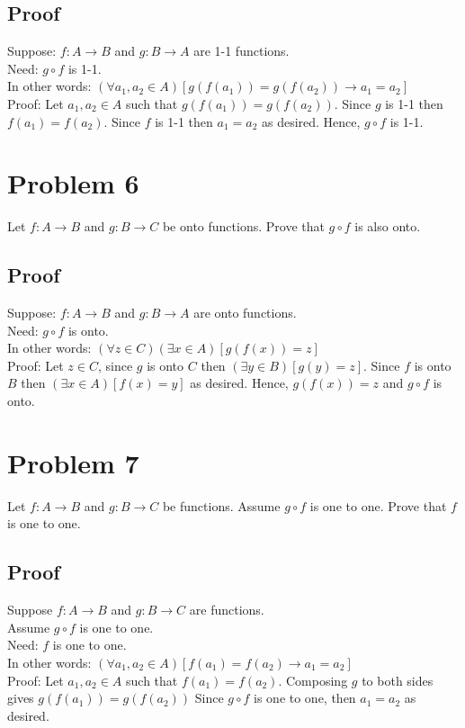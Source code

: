 \documentclass{article}
\begin{document}
\subsection*{Proof}
Suppose: $f: A \rightarrow B$ and $g: B \rightarrow A$ are 1-1 functions. \\
Need: $g \circ f$ is 1-1. \\
In other words: $(\forall a_1, a_2 \in A)[g(f(a_1)) = g(f(a_2)) \rightarrow a_1 = a_2]$\\
Proof: Let $a_1, a_2 \in A$ such that $g(f(a_1)) = g(f(a_2))$. Since $g$ is 1-1 then $f(a_1) = f(a_2)$. Since $f$ is 1-1 then $a_1 = a_2$ as desired. Hence, $g \circ f$ is 1-1.
\section*{Problem 6}
Let $f : A \rightarrow B$ and $g : B \rightarrow C$ be onto functions. Prove that $g \circ f$ is also onto.
\subsection*{Proof}
Suppose: $f: A \rightarrow B$ and $g: B \rightarrow A$ are onto functions. \\
Need: $g \circ f$ is onto. \\
In other words: $(\forall z \in C)(\exists x \in A)[g(f(x)) = z]$\\
Proof: Let $z \in C$, since $g$ is onto $C$ then $(\exists y \in B)[g(y) = z]$. Since $f$ is onto $B$ then $(\exists x \in A)[f(x) = y]$ as desired. Hence, $g(f(x)) = z$ and $g \circ f$ is onto. 
\section*{Problem 7}
Let $f : A \rightarrow B$ and $g : B \rightarrow C$ be functions. Assume $g \circ f$ is one to one. Prove that $f$ is one to one.
\subsection*{Proof}
Suppose $f : A \rightarrow B$ and $g : B \rightarrow C$ are functions. \\
Assume $g \circ f$ is one to one. \\
Need: $f$ is one to one. \\
In other words: $(\forall a_1, a_2 \in A)[f(a_1) = f(a_2) \rightarrow a_1 = a_2]$\\
Proof: Let $a_1, a_2 \in A$ such that $f(a_1) = f(a_2)$. 
Composing $g$ to both sides gives $g(f(a_1)) =g(f(a_2))$
Since $g \circ f$ is one to one, then $a_1 = a_2$ as desired. 
\end{document}
